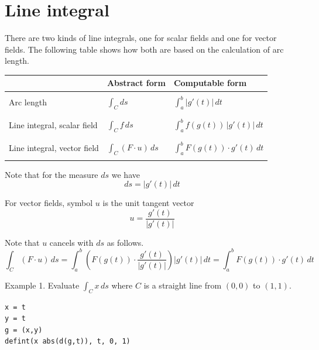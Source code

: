 
\newpage

\section{Line integral}

There are two kinds of line integrals,
one for scalar fields and one for vector fields.
The following table shows how both are based on the calculation of
arc length.

\begin{center}
\begin{tabular}{|l|l|l|}
\hline
& Abstract form
& Computable form
\\
\hline
& &\\
Arc length
& $\displaystyle{\int_C ds}$
& $\displaystyle{\int_a^b |g'(t)|\,dt}$\\
& &\\
\hline
 & & \\
Line integral, scalar field
& $\displaystyle{\int_C f\,ds}$
& $\displaystyle{\int_a^b f(g(t))\,|g'(t)|\,dt}$\\
& &\\
\hline
 & & \\
Line integral, vector field
& $\displaystyle{\int_C(F\cdot u)\,ds}$
& $\displaystyle{\int_a^b F(g(t))\cdot g'(t)\,dt}$\\
 & & \\
\hline
\end{tabular}
\end{center}

Note that for the measure $ds$ we have
\begin{equation*}
ds=|g'(t)|\,dt
\end{equation*}

For vector fields, symbol $u$ is the unit tangent vector
\begin{equation*}
u=\frac{g'(t)}{|g'(t)|}
\end{equation*}

Note that $u$ cancels with $ds$ as follows.
\begin{equation*}
\int_C(F\cdot u)\,ds
=\int_a^b
\left(F(g(t))\cdot\frac{g'(t)}{|g'(t)|}\right)
|g'(t)|\,dt
=\int_a^b F(g(t))\cdot g'(t)\,dt
\end{equation*}

Example 1. Evaluate $\int_Cx\,ds$
where $C$ is a straight line from $(0,0)$ to $(1,1)$.

{\color{blue}
\begin{verbatim}
x = t
y = t
g = (x,y)
defint(x abs(d(g,t)), t, 0, 1)
\end{verbatim}}

